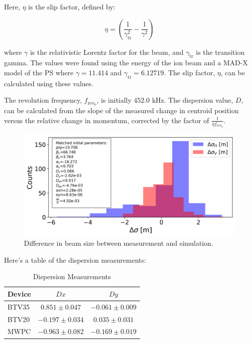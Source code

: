 \documentclass[a4paper,
               biblatex,     %
               ]{jacow}
\begin{document}
Here, $\eta$ is the slip factor, defined by:

\begin{equation}
\eta = \left(\frac{1}{\gamma_{\text{tr}}^{2}} - \frac{1}{\gamma^{2}}\right)
\end{equation}

where $\gamma$ is the relativistic Lorentz factor for the beam, and $\gamma_{\text{tr}}$ is the transition gamma. The values were found using the energy of the ion beam and a MAD-X model of the PS where $\gamma = 11.414$ and $\gamma_{\text{tr}} = 6.12719$. The slip factor, $\eta$, can be calculated using these values.

The revolution frequency, $f_{\text{rev}_0}$, is initially $452.0$ kHz. The dispersion value, $D$, can be calculated from the slope of the measured change in centroid position versus the relative change in momentum, corrected by the factor of $\frac{1}{\eta f_{\text{rev}_0}}$.



\begin{figure}[!htb]
   \centering
   \includegraphics*[width=1.0\columnwidth]{beam_size_diff.png}
   \caption{Difference in beam size between measurement and simulation.}
   \label{fig:diff_beam_size}
\end{figure}

Here's a table of the dispersion measurements:

\begin{table}[h!]
\centering
\caption{Dispersion Measurements}
\begin{tabular}{l c c}
\hline
Device & \(Dx\) & \(Dy\) \\
\hline
BTV35  & \(0.851 \pm 0.047\) & \(-0.061 \pm 0.009\) \\
BTV20  & \(-0.197 \pm 0.034\) & \(0.035 \pm 0.031\) \\
MWPC   & \(-0.963 \pm 0.082\) & \(-0.169 \pm 0.019\) \\
\hline
\end{tabular}
\end{table}
\end{document}
